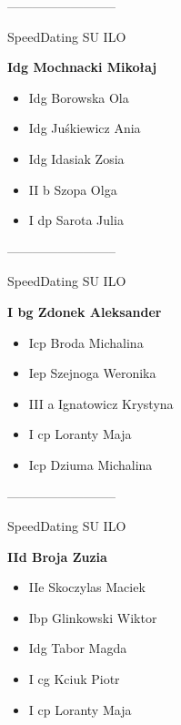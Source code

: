 \documentclass[a4paper,10pt]{article}
\begin{document}
\begin{multicols}{3}
\begin{minipage}[l]{\textwidth}
\end{minipage}



\begin{minipage}[l]{\textwidth}
--------------------------

  \footnotesize{SpeedDating SU ILO}

  \bfseries{Idg Mochnacki Mikołaj}

  \begin{itemize}
    \item Idg Borowska Ola
    \item Idg Juśkiewicz Ania
    \item Idg Idasiak Zosia
    \item II b Szopa Olga
    \item I dp Sarota Julia

    \end{itemize}



\end{minipage}



\begin{minipage}[l]{\textwidth}
--------------------------

  \footnotesize{SpeedDating SU ILO}

  \bfseries{I bg Zdonek Aleksander}

  \begin{itemize}
    \item Icp Broda Michalina
    \item Iep Szejnoga Weronika
    \item III a Ignatowicz Krystyna
    \item I cp Loranty Maja
    \item Icp Dziuma Michalina

    \end{itemize}



\end{minipage}



\begin{minipage}[l]{\textwidth}
--------------------------

  \footnotesize{SpeedDating SU ILO}

  \bfseries{IId Broja Zuzia}

  \begin{itemize}
    \item IIe Skoczylas Maciek
    \item Ibp Glinkowski Wiktor
    \item Idg Tabor Magda
    \item I cg Kciuk Piotr
    \item I cp Loranty Maja


\end{itemize}
\end{minipage}
\end{multicols}
\end{document}
